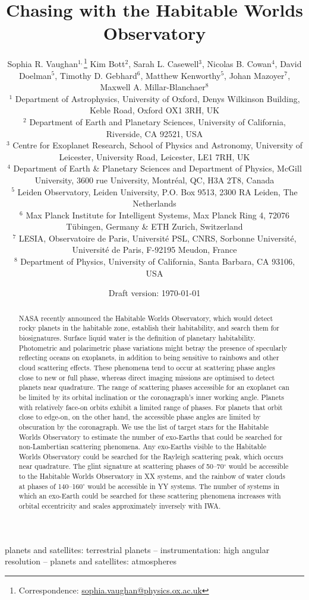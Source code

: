 \documentclass[
    usenatbib,
]{mnras}
\title{Chasing \rainbows with the Habitable Worlds Observatory}
\author[Sophia R. Vaughan et al.]{%
    Sophia R. Vaughan$^{1,}$\thanks{Correspondence:  \url{sophia.vaughan@physics.ox.ac.uk}}
    Kim Bott$^{2}$,
    Sarah L. Casewell$^{3}$,
    Nicolas B. Cowan$^{4}$,
    David Doelman$^{5}$,\newauthor
    Timothy D. Gebhard$^{6}$,
    Matthew Kenworthy$^{5}$,
    Johan Mazoyer$^{7}$,
    Maxwell A. Millar-Blanchaer$^{8}$
    \newauthor [remaining workshop participants in alphabetical order] \newauthor 
    \\
    $^{1}$ Department of Astrophysics, University of Oxford, Denys Wilkinson Building, Keble Road, Oxford OX1 3RH, UK\\
    $^{2}$ Department of Earth and Planetary Sciences, University of California, Riverside, CA 92521, USA \\
    $^{3}$ Centre for Exoplanet Research, School of Physics and Astronomy, University of Leicester, University Road, Leicester, LE1 7RH, UK\\
    $^{4}$ Department of Earth \& Planetary Sciences and Department of Physics, McGill University, 3600 rue University, Montréal, QC, H3A 2T8, Canada\\
    $^{5}$ Leiden Observatory, Leiden University, P.O. Box 9513, 2300 RA Leiden, The Netherlands\\
    $^{6}$ Max Planck Institute for Intelligent Systems, Max Planck Ring 4, 72076 Tübingen, Germany \& ETH Zurich, Switzerland \\
    $^{7}$ LESIA, Observatoire de Paris, Université PSL, CNRS, Sorbonne Université, Université de Paris, F-92195 Meudon, France \\
    $^{8}$ Department of Physics, University of California, Santa Barbara, CA 93106, USA 
}
\date{Draft version: \today}
\begin{document}
 

\maketitle

\begin{abstract}
NASA recently announced the Habitable Worlds Observatory, which would detect rocky planets in the habitable zone, establish their habitability, and search them for biosignatures. 
Surface liquid water is the definition of planetary habitability. Photometric and polarimetric phase variations might betray the presence of specularly reflecting oceans on exoplanets, in addition to being sensitive to rainbows and other cloud scattering effects. These phenomena tend to occur at scattering phase angles close to new or full phase, whereas direct imaging missions are optimised to detect planets near quadrature. The range of scattering phases accessible for an exoplanet can be limited by its orbital inclination or the coronagraph's inner working angle. Planets with relatively face-on orbits exhibit a limited range of phases. For planets that orbit close to edge-on, on the other hand, the accessible phase angles are limited by obscuration by the coronagraph. We use the list of target stars for the Habitable Worlds Observatory to estimate the number of exo-Earths that could be searched for non-Lambertian scattering phenomena. Any exo-Earths visible to the Habitable Worlds Observatory could be searched for the Rayleigh scattering peak, which occurs near quadrature. The glint signature at scattering phases of 50--70$^\circ$ would be accessible to the Habitable Worlds Observatory in XX systems, and the rainbow of water clouds at phases of 140--160$^\circ$ would be accessible in YY systems. The number of systems in which an exo-Earth could be searched for these scattering phenomena increases with orbital eccentricity and scales approximately inversely with IWA.       


\end{abstract}

\begin{keywords}
planets and satellites: terrestrial planets -- instrumentation: high angular resolution -- planets and satellites: atmospheres
\end{keywords}
\end{document}
